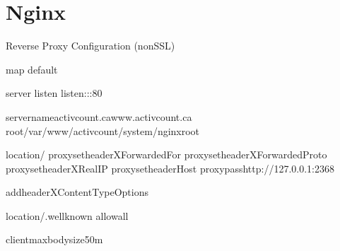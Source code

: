 \documentclass[letterpaper,10pt,english]{sphinxmanual}
\begin{document}
\section{Nginx}
\label{\detokenize{configurations:nginx}}
\sphinxAtStartPar
Reverse Proxy Configuration (non\sphinxhyphen{}SSL)

\begin{sphinxVerbatim}[commandchars=\\\{\}]
map
default

server
listen
listen\PYG{o}{[}::\PYG{o}{]}:80

server\PYGZus{}nameactivcount.cawww.activcount.ca
root/var/www/activcount/system/nginx\PYGZhy{}root

location/
proxy\PYGZus{}set\PYGZus{}headerX\PYGZhy{}Forwarded\PYGZhy{}For
proxy\PYGZus{}set\PYGZus{}headerX\PYGZhy{}Forwarded\PYGZhy{}Proto
proxy\PYGZus{}set\PYGZus{}headerX\PYGZhy{}Real\PYGZhy{}IP
proxy\PYGZus{}set\PYGZus{}headerHost
proxy\PYGZus{}passhttp://127.0.0.1:2368

add\PYGZus{}headerX\PYGZhy{}Content\PYGZhy{}Type\PYGZhy{}Options

location\PYGZti{}/.well\PYGZhy{}known
allowall

client\PYGZus{}max\PYGZus{}body\PYGZus{}size50m
\end{sphinxVerbatim}
\end{document}
